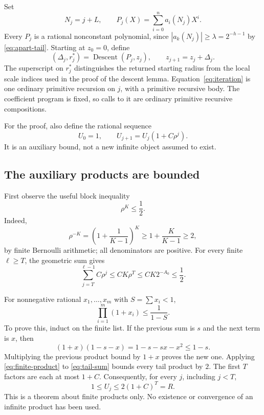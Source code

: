 \documentclass[11pt,letterpaper]{article}
\theoremstyle{definition}\newtheorem{definition}[theorem]{Definition}
\theoremstyle{remark}\newtheorem{remark}[theorem]{Remark}
\begin{document}
Set
\begin{equation}
 N_j=j+L,\qquad P_j(X)=\sum_{i=0}^n a_i(N_j)X^i.
 \label{eq:sample-polynomial}
\end{equation}
Every $P_j$ is a rational nonconstant polynomial, since
$|a_k(N_j)|\ge\lambda=2^{-h-1}$ by \eqref{eq:apart-tail}.
Starting at $z_0=0$, define
\begin{equation}
 (\Delta_j,r_j^*)=\operatorname{Descent}(P_j,z_j),
 \qquad z_{j+1}=z_j+\Delta_j.
 \label{eq:iteration}
\end{equation}
The superscript on $r_j^*$ distinguishes the returned starting radius from
the local scale indices used in the proof of the descent lemma.
Equation~\eqref{eq:iteration} is one ordinary primitive recursion on $j$,
with a primitive recursive body. The coefficient program is fixed, so calls
to it are ordinary primitive recursive compositions.

For the proof, also define the rational sequence
\begin{equation}
 U_0=1,\qquad U_{j+1}=U_j(1+C\rho^j).
 \label{eq:U}
\end{equation}
It is an auxiliary bound, not a new infinite object assumed to exist.

\subsection{The auxiliary products are bounded}

First observe the useful block inequality
\begin{equation}
 \rho^K\le\frac12.
 \label{eq:block}
\end{equation}
Indeed,
\[
 \rho^{-K}=\left(1+\frac1{K-1}\right)^K
     \ge1+\frac K{K-1}\ge2,
\]
by finite Bernoulli arithmetic; all denominators are positive.
For every finite $\ell\ge T$, the geometric sum gives
\begin{equation}
 \sum_{j=T}^{\ell-1}C\rho^j
       \le CK\rho^T\le CK2^{-A_0}\le\frac12.
 \label{eq:tail-sum}
\end{equation}

For nonnegative rational $x_1,\ldots,x_m$ with $S=\sum x_i<1$,
\begin{equation}
 \prod_{i=1}^m(1+x_i)\le\frac1{1-S}.
 \label{eq:finite-product}
\end{equation}
To prove this, induct on the finite list. If the previous sum is $s$ and
the next term is $x$, then
\[
 (1+x)(1-s-x)=1-s-sx-x^2\le1-s.
\]
Multiplying the previous product bound by $1+x$ proves the new one.
Applying \eqref{eq:finite-product} to \eqref{eq:tail-sum} bounds every
tail product by $2$. The first $T$ factors are each at most $1+C$.
Consequently, for every $j$, including $j<T$,
\begin{equation}
 1\le U_j\le2(1+C)^T=R.
 \label{eq:U-bound}
\end{equation}
This is a theorem about finite products only. No existence or convergence
of an infinite product has been used.
\end{document}
